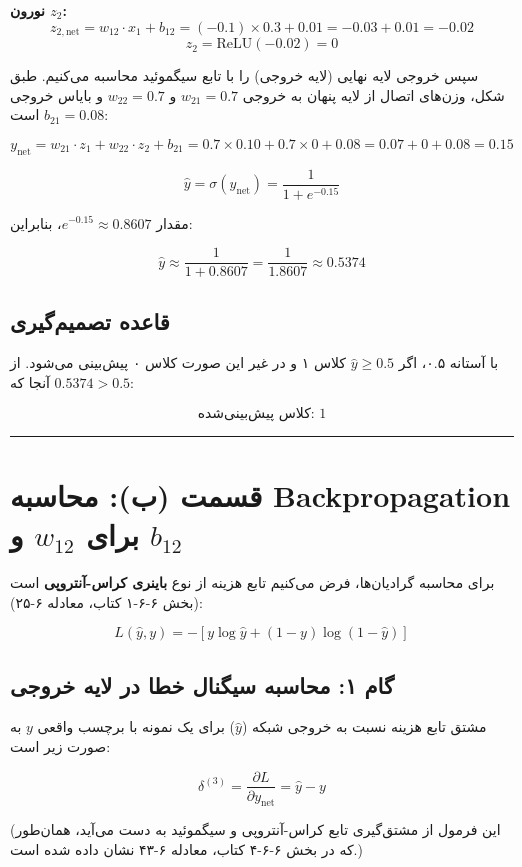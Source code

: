 \documentclass[11pt,a4paper]{article}
\newcommand{\en}[1]{\textenglish{#1}}
\newcommand{\separator}{\vspace{1em}\noindent\rule{\linewidth}{0.4pt}\vspace{1em}}
\begin{document}
\textbf{نورون \(z_2\):}
\[
z_{2,\text{net}} = w_{12} \cdot x_1 + b_{12} = (-0.1) \times 0.3 + 0.01 = -0.03 + 0.01 = -0.02
\]
\[
z_2 = \text{ReLU}(-0.02) = 0
\]

سپس خروجی لایه نهایی (لایه خروجی) را با تابع سیگموئید محاسبه می‌کنیم. طبق شکل، وزن‌های اتصال از لایه پنهان به خروجی \(w_{21} = 0.7\) و \(w_{22} = 0.7\) و بایاس خروجی \(b_{21} = 0.08\) است:

\[
y_{\text{net}} = w_{21} \cdot z_1 + w_{22} \cdot z_2 + b_{21} = 0.7 \times 0.10 + 0.7 \times 0 + 0.08 = 0.07 + 0 + 0.08 = 0.15
\]

\[
\hat{y} = \sigma(y_{\text{net}}) = \frac{1}{1 + e^{-0.15}}
\]

مقدار \(e^{-0.15} \approx 0.8607\)، بنابراین:

\[
\hat{y} \approx \frac{1}{1 + 0.8607} = \frac{1}{1.8607} \approx 0.5374
\]

\subsection{قاعده تصمیم‌گیری}

با آستانه ۰.۵، اگر \(\hat{y} \ge 0.5\) کلاس ۱ و در غیر این صورت کلاس ۰ پیش‌بینی می‌شود. از آنجا که \(0.5374 > 0.5\):

\[
\boxed{\text{کلاس پیش‌بینی‌شده: } 1}
\]

\separator
\section{قسمت (ب): محاسبه \en{Backpropagation} برای \(w_{12}\) و \(b_{12}\)}

برای محاسبه گرادیان‌ها، فرض می‌کنیم تابع هزینه از نوع \textbf{باینری کراس-آنتروپی} است (بخش \en{۶-۶-۱} کتاب، معادله \en{۶-۲۵}):

\[
L(\hat{y}, y) = -[y \log \hat{y} + (1-y) \log(1-\hat{y})]
\]

\subsection{گام ۱: محاسبه سیگنال خطا در لایه خروجی}

مشتق تابع هزینه نسبت به خروجی شبکه (\(\hat{y}\)) برای یک نمونه با برچسب واقعی \(y\) به صورت زیر است:

\[
\delta^{(3)} = \frac{\partial L}{\partial y_{\text{net}}} = \hat{y} - y
\]

(این فرمول از مشتق‌گیری تابع کراس-آنتروپی و سیگموئید به دست می‌آید، همان‌طور که در بخش \en{۶-۶-۴} کتاب، معادله \en{۶-۴۳} نشان داده شده است.)
\end{document}
